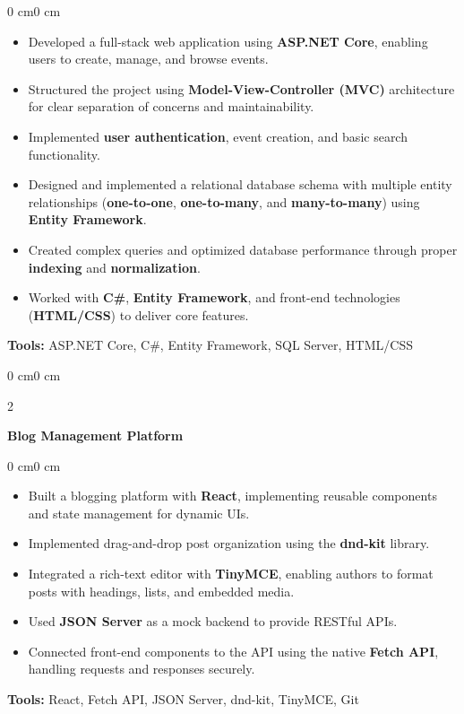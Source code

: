 \documentclass[10pt, letterpaper]{article}
\newenvironment{highlights}{
    \begin{itemize}[
        topsep=0.10 cm,
        parsep=0.10 cm,
        partopsep=0pt,
        itemsep=0pt,
        leftmargin=0 cm + 10pt
    ]
}{
    \end{itemize}
}
\newenvironment{onecolentry}{
    \begin{adjustwidth}{0 cm}{0 cm}
}{
    \end{adjustwidth}
}
\newenvironment{twocolentry}[2][]{
    \onecolentry
    \def\secondColumn{#2}
    \setcolumnwidth{\fill, 4.5 cm}
    \begin{paracol}{2}
}{
    \switchcolumn \raggedleft \secondColumn
    \end{paracol}
    \endonecolentry
}
\begin{document}
        \begin{onecolentry}
            \begin{highlights}
                \item Developed a full-stack web application using \textbf{ASP.NET Core}, enabling users to create, manage, and browse events.
                \item Structured the project using \textbf{Model-View-Controller (MVC)} architecture for clear separation of concerns and maintainability.
                \item Implemented \textbf{user authentication}, event creation, and basic search functionality.
                \item Designed and implemented a relational database schema with multiple entity relationships (\textbf{one-to-one}, \textbf{one-to-many}, and \textbf{many-to-many}) using \textbf{Entity Framework}.
                \item Created complex queries and optimized database performance through proper \textbf{indexing} and \textbf{normalization}.
                \item Worked with \textbf{C\#}, \textbf{Entity Framework}, and front-end technologies (\textbf{HTML/CSS}) to deliver core features.
            \end{highlights}
            \textbf{Tools:} ASP.NET Core, C\#, Entity Framework, SQL Server, HTML/CSS
        \end{onecolentry}

        \vspace{0.4cm}

        \begin{twocolentry}{}
            \textbf{Blog Management Platform}
        \end{twocolentry}
        
        \begin{onecolentry}
            \begin{highlights}
                \item Built a blogging platform with \textbf{React}, implementing reusable components and state management for dynamic UIs.
                \item Implemented drag-and-drop post organization using the \textbf{dnd-kit} library.
                \item Integrated a rich-text editor with \textbf{TinyMCE}, enabling authors to format posts with headings, lists, and embedded media.
                \item Used \textbf{JSON Server} as a mock backend to provide RESTful APIs.
                \item Connected front-end components to the API using the native \textbf{Fetch API}, handling requests and responses securely.
            \end{highlights}
            \textbf{Tools:} React, Fetch API, JSON Server, dnd-kit, TinyMCE, Git
        \end{onecolentry}
\end{document}
